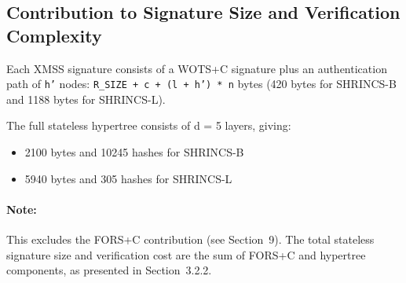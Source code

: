 \subsection{Contribution to Signature Size and Verification Complexity}
Each XMSS signature consists of a WOTS+C signature plus an authentication path of \texttt{h'} nodes: \texttt{R\_SIZE + c + (l + h') * n} bytes (420 bytes for SHRINCS-B and 1188 bytes for SHRINCS-L).

The full stateless hypertree consists of d = 5 layers, giving:
\begin{itemize}
    \item 2100 bytes and 10245 hashes for SHRINCS-B
    \item 5940 bytes and 305 hashes for SHRINCS-L
\end{itemize}

\paragraph{Note:} This excludes the FORS+C contribution (see Section~9). The total stateless signature size and verification cost are the sum of FORS+C and hypertree components, as presented in Section~3.2.2.